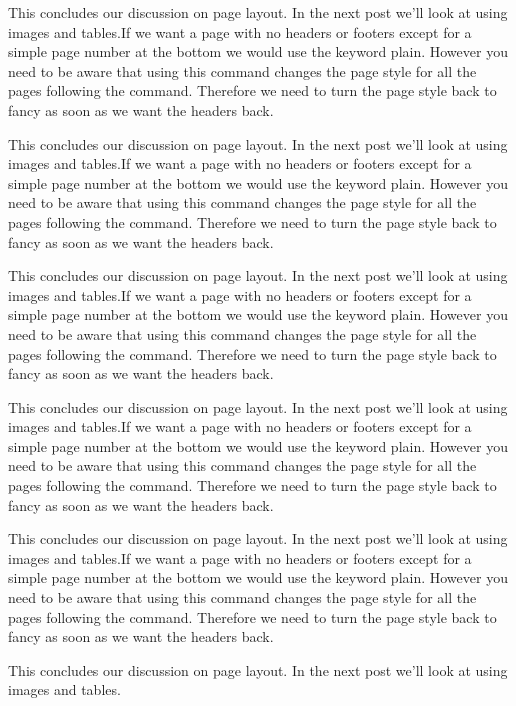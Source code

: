 This concludes our discussion on page layout. In the next post we'll look at using images and tables.If we want a page with no headers or footers except for a simple page number at the bottom we would use the keyword plain. However you need to be aware that using this command changes the page style for all the pages following the command. Therefore we need to turn the page style back to fancy as soon as we want the headers back.

This concludes our discussion on page layout. In the next post we'll look at using images and tables.If we want a page with no headers or footers except for a simple page number at the bottom we would use the keyword plain. However you need to be aware that using this command changes the page style for all the pages following the command. Therefore we need to turn the page style back to fancy as soon as we want the headers back.

This concludes our discussion on page layout. In the next post we'll look at using images and tables.If we want a page with no headers or footers except for a simple page number at the bottom we would use the keyword plain. However you need to be aware that using this command changes the page style for all the pages following the command. Therefore we need to turn the page style back to fancy as soon as we want the headers back.

This concludes our discussion on page layout. In the next post we'll look at using images and tables.If we want a page with no headers or footers except for a simple page number at the bottom we would use the keyword plain. However you need to be aware that using this command changes the page style for all the pages following the command. Therefore we need to turn the page style back to fancy as soon as we want the headers back.

This concludes our discussion on page layout. In the next post we'll look at using images and tables.If we want a page with no headers or footers except for a simple page number at the bottom we would use the keyword plain. However you need to be aware that using this command changes the page style for all the pages following the command. Therefore we need to turn the page style back to fancy as soon as we want the headers back.

This concludes our discussion on page layout. In the next post we'll look at using images and tables.